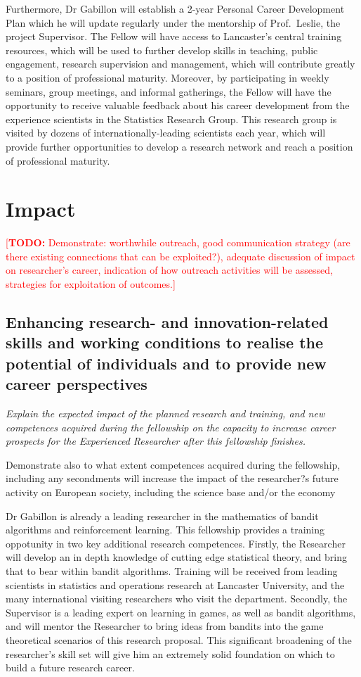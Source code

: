 \documentclass[a4paper,11pt]{article}
\newcommand{\TODO}[1]{{\textcolor{red}{[\textbf{TODO:} #1]}}}
\begin{document}
Furthermore, Dr Gabillon will establish a 2-year Personal Career Development Plan which he will update regularly under the mentorship of Prof.\ Leslie, the project Supervisor.  The Fellow will have access to Lancaster's central training resources, which will be used to further develop skills in teaching, public engagement, research supervision and management, which will contribute greatly to a position of professional maturity.  Moreover, by participating in weekly seminars, group meetings, and informal gatherings, the Fellow will have the opportunity to receive valuable feedback about his career development from the experience scientists in the Statistics Research Group.  This research group is visited by dozens of internationally-leading scientists each year, which will provide further opportunities to develop a research network and reach a position of professional maturity.

\section{Impact}
\label{sec:impact}

\TODO{Demonstrate: worthwhile outreach, good communication strategy (are there existing connections that can be exploited?), adequate discussion of impact on researcher's career, indication of how outreach activities will be assessed, strategies for exploitation of outcomes.}

\subsection{Enhancing research- and innovation-related skills and working conditions to realise the potential of individuals and to provide new career perspectives}
\label{sec:enhancement}

{\em
Explain the expected impact of the planned research and training, and new competences acquired during the fellowship on the capacity to increase career prospects for the Experienced Researcher after this fellowship finishes.

Demonstrate also to what extent competences acquired during the fellowship, including any secondments will increase the impact of the researcher?s future activity on European society, including the science base and/or the economy
}

Dr Gabillon is already a leading researcher in the mathematics of bandit algorithms and reinforcement learning.  This fellowship provides a training oppotunity in two key additional research competences.  Firstly, the Researcher will develop an in depth knowledge of cutting edge statistical theory, and bring that to bear within bandit algorithms.  Training will be received from leading scientists in statistics and operations research at Lancaster University, and the many international visiting researchers who visit the department.   Secondly, the Supervisor is a leading expert on learning in games, as well as bandit algorithms, and will mentor the Researcher to bring ideas from bandits into the game theoretical scenarios of this research proposal.  This significant broadening of the researcher's skill set will give him an extremely solid foundation on which to build a future research career.
\end{document}
